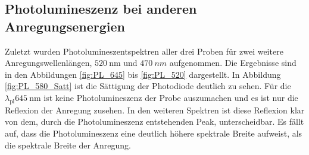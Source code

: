 \subsection{Photolumineszenz bei anderen Anregungsenergien}
\label{sec:weisslicht}
Zuletzt wurden Photolumineszentspektren aller drei Proben für zwei weitere Anregungswellenlängen, $\SI{520}{\nano\meter}$ und $\SI{470}{nm}$ aufgenommen. Die Ergebnisse sind in den Abbildungen \ref{fig:PL_645} bis \ref{fig:PL_520} dargestellt. In Abbildung \ref{fig:PL_580_Satt} ist die Sättigung der Photodiode deutlich zu sehen. Für die $\lambda_{\text{pl}}\SI{645}{\nano\meter}$  ist keine Photolumineszenz der Probe auszumachen und es ist nur die Reflexion der Anregung zusehen. In den weiteren Spektren ist diese Reflexion klar von dem, durch die Photolumineszenz entstehenden Peak, unterscheidbar. Es fällt auf, dass die Photolumineszenz eine deutlich höhere spektrale Breite aufweist, als die spektrale Breite der Anregung.
